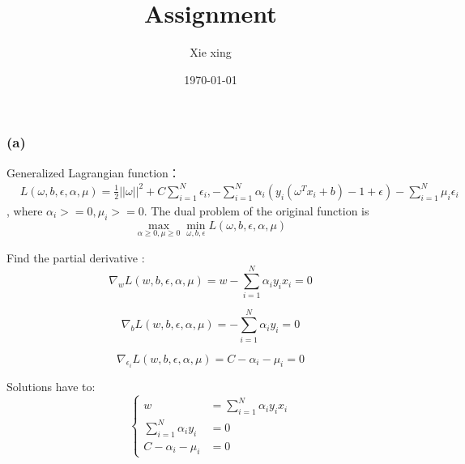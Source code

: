\documentclass[oneside,solution]{seu-ml-assign}
\title{Assignment}
\author{Xie xing}
\date{\today}
\begin{document}
\maketitle


\subsection{}


\subsubsection{(a)}
Generalized Lagrangian function：
\begin{equation}\begin{aligned}             & L(\omega,b,\epsilon,\alpha,\mu)=\frac12||\omega||^2+C\sum_{i=1}^N\epsilon_i,-\sum_{i=1}^N
                           \alpha_i(y_i(\omega^Tx_i+b) -1 + \epsilon)-\sum_{i=1}^N\mu_i\epsilon_i\end{aligned}
\end{equation},
where $ \alpha_i >= 0, \mu_i >=0$.
The dual problem of the original function is
\begin{equation}\max_{\alpha\geq0,\mu\geq0}\min_{\omega,b,\epsilon}L(\omega,b,\epsilon,\alpha,\mu)\end{equation}

Find the partial derivative :
\begin{equation}
  \nabla_{w}L(w,b,\epsilon,\alpha,\mu)=w-\sum_{i=1}^{N}\alpha_{i}y_{i}x_{i}=0
\end{equation}

\begin{equation}
  \nabla_{b}L(w,b,\epsilon,\alpha,\mu)=-\sum_{i=1}^{N}\alpha_{i}y_{i}=0
\end{equation}

\begin{equation}
  \nabla_{\epsilon_{i}}L(w,b,\epsilon,\alpha,\mu)=C-\alpha_{i}-\mu_{i}=0
\end{equation}

Solutions have to:
\begin{equation}\left.\left\{\begin{aligned}w                       & =\sum_{i=1}^N\alpha_iy_ix_i \\
               \sum_{i=1}^N\alpha_iy_i & =0                          \\
               C-\alpha_i-\mu_i        & =0\end{aligned}\right.\right.
\end{equation}
\end{document}
